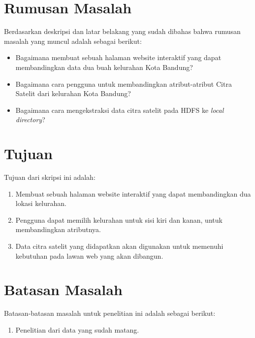 \section{Rumusan Masalah}
\label{sec:rumusan}
Berdasarkan deskripsi dan latar belakang yang sudah dibahas bahwa rumusan masalah yang muncul adalah sebagai berikut:

\begin{itemize}
	\item Bagaimana membuat sebuah halaman website interaktif yang dapat membandingkan data dua buah kelurahan Kota Bandung?
	\item Bagaimana cara pengguna untuk membandingkan atribut-atribut Citra Satelit dari kelurahan Kota Bandung?
	\item Bagaimana cara mengekstraksi data citra satelit pada HDFS ke \textit{local directory}?	
\end{itemize}

\section{Tujuan}
\label{sec:tujuan}
Tujuan dari skripsi ini adalah:
\begin{enumerate}
	\item Membuat sebuah halaman website interaktif yang dapat membandingkan dua lokasi kelurahan.
	\item Pengguna dapat memilih kelurahan untuk sisi kiri dan kanan, untuk membandingkan atributnya.
	\item Data citra satelit yang didapatkan akan digunakan untuk memenuhi kebutuhan pada lawan web yang akan dibangun.
\end{enumerate}


\section{Batasan Masalah}
\label{sec:batasan}

Batasan-batasan masalah untuk penelitian ini adalah sebagai berikut:
\begin{enumerate}
	\item Penelitian dari data yang sudah matang.
\end{enumerate}

